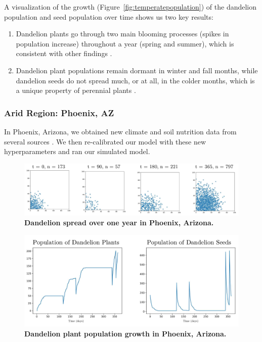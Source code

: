 A visualization of the growth (Figure~\ref{fig:temperatepopulation}) of the dandelion population and seed population over time shows us two key results:

\begin{enumerate}
    \item Dandelion plants go through two main blooming processes (spikes in population increase) throughout a year (spring and summer), which is consistent with other findings \cite{noauthor_dandelion_nodate-2}.
    \item Dandelion plant populations remain dormant in winter and fall months, while dandelion seeds do not spread much, or at all, in the colder months, which is a unique property of perennial plants \cite{noauthor_dandelion_nodate-2}.
\end{enumerate}

\subsubsection{Arid Region: Phoenix, AZ}

In Phoenix, Arizona, we obtained new climate and soil nutrition data from several sources \cite{arizona_guide_nodate, ottman_arizona_nodate, noauthor_average_nodate}. We then re-calibrated our model with these new hyperparameters and ran our simulated model.

\begin{figure}[h!]
\centering
    \includegraphics[scale=0.6]{figures/arizonaspread.pdf}
    \captionsetup{width=0.9\textwidth}
    \caption{\textbf{Dandelion spread over one year in Phoenix, Arizona.}}
    \label{fig:arizonaspread}
\end{figure}

\begin{figure}[h!]
\centering
    \includegraphics[scale=0.5]{figures/arizonapopulation.pdf}
    \captionsetup{width=0.9\textwidth}
    \caption{\textbf{Dandelion plant population growth in Phoenix, Arizona.}}
    \label{fig:arizonapopulation}
\end{figure}

